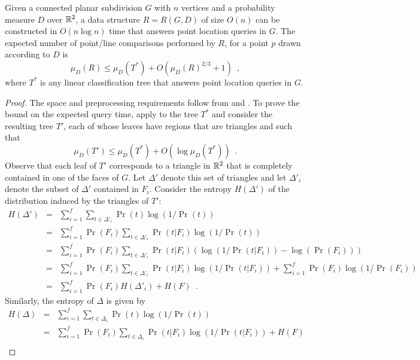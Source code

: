 \documentclass[lotsofwhite]{patmorin}
\begin{document}
\begin{thm}
Given a connected planar subdivision $G$ with $n$ vertices and a probability
measure $D$ over $\mathbb{R}^2$, a data structure $R=R(G,D)$ of size $O(n)$ can be
constructed in $O(n\log n)$ time that answers point location queries in $G$.
The expected number of point/line comparisons performed by $R$, 
for a point $p$ drawn according to $D$ is 
\[
  \mu_D(R) \le \mu_D(T^*) + O(\mu_D(R)^{2/3}+1) \enspace , 
\] 
where $T^*$ is any linear classification tree that answers point
location queries in $G$.
\end{thm}

\begin{proof}
The space and preprocessing requirements follow from
 and .
To prove the bound on the expected query time, apply
 to the tree $T^*$ and consider the resulting tree
$T'$, each of whose leaves have regions that are triangles and such
that
\[
     \mu_D(T') \le \mu_D(T^*) + O(\log \mu_D(T^*)) \enspace .
\]
Observe that each leaf of $T'$ corresponds to a triangle in $\mathbb{R}^2$
that is completely contained in one of the faces of $G$.  Let
$\Delta'$ denote this set of triangles and let $\Delta'_i$ denote the
subset of $\Delta'$ contained in $F_i$.
Consider the entropy $H(\Delta')$ of the distribution induced by the
triangles of $T'$:
\begin{eqnarray*}
   H(\Delta') 
     & = & \sum_{i=1}^f \sum_{t\in \Delta'_i}\Pr(t)\log(1/\Pr(t)) \\
     & = & \sum_{i=1}^f \Pr(F_i)\sum_{t\in \Delta'_i}
            \Pr(t|F_i)\log(1/\Pr(t)) \\
     & = & \sum_{i=1}^f \Pr(F_i)\sum_{t\in \Delta'_i}
            \Pr(t|F_i)
            \left(
              \log(1/\Pr(t|F_i))-\log(\Pr(F_i))
            \right) \\
     & = & \sum_{i=1}^f \Pr(F_i)\sum_{t\in \Delta'_i}
            \Pr(t|F_i)\log(1/\Pr(t|F_i)) 
          +
      \sum_{i=1}^f \Pr(F_i) \log(1/\Pr(F_i)) \\
     & = & \sum_{i=1}^f \Pr(F_i) H(\Delta'_i) + H(F) \enspace .
\end{eqnarray*}
Similarly, the entropy of $\Delta$ is given by 
\begin{eqnarray*}
   H(\Delta) 
     & = & \sum_{i=1}^f \sum_{t\in \Delta_i}\Pr(t)\log(1/\Pr(t)) \\
     & = & \sum_{i=1}^f \Pr(F_i)\sum_{t\in \Delta_i}
            \Pr(t|F_i)\log(1/\Pr(t|F_i)) 
          + H(F) \\

\end{eqnarray*}
\end{proof}
\end{document}
